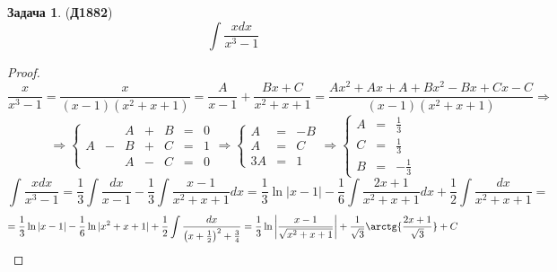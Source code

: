 \documentclass[12pt]{article}
\theoremstyle{definition}
\newtheorem{problem}{Задача}
\DeclareMathOperator{\dint}{\displaystyle\int}
\begin{document}
\begin{problem}(\textbf{Д1882})
	$$
		\dint \dfrac{xdx}{x^3 - 1}
	$$
\end{problem}
\begin{proof}
	$$
		\dfrac{x}{x^3 - 1} = \dfrac{x}{(x-1)(x^2+ x + 1)} = \dfrac{A}{x- 1} + \dfrac{Bx + C}{x^2 + x + 1} = \dfrac{Ax^2 + Ax + A + Bx^2 -Bx + Cx - C}{(x-1)(x^2+ x + 1)} \Rightarrow
	$$
	$$
		\Rightarrow 
		\left\{
			\begin{matrix}
				&&A &+& B &=& 0\\
				A &-& B &+& C &=& 1\\
				&&A &-& C &=& 0
			\end{matrix}
		\right.
		\Rightarrow 
		\left\{
			\begin{matrix}
				A &=& - B \\
				A &=& C\\
				3A &=& 1
			\end{matrix}
		\right.
		\Rightarrow 
		\left\{
			\begin{matrix}
				A &=& \tfrac{1}{3} \\[5pt]
				C &=& \tfrac{1}{3}\\[5pt]
				B &=& -\tfrac{1}{3}
			\end{matrix}
		\right.
	$$
	$$
		\dint \dfrac{xdx}{x^3 - 1} = \dfrac{1}{3}\dint \dfrac{dx}{x - 1}  -\dfrac{1}{3}\dint \dfrac{x - 1}{x^2 + x + 1}dx = \dfrac{1}{3}\ln{|x-1|} - \dfrac{1}{6}\dint \dfrac{2x + 1}{x^2 + x + 1}dx + \dfrac{1}{2}\dint \dfrac{dx}{x^2 + x + 1} =
	$$
	$$
		= \dfrac{1}{3}\ln{|x-1|} -\dfrac{1}{6}\ln{|x^2 + x + 1|} + \dfrac{1}{2}\dint\dfrac{dx}{\left(x + \frac{1}{2}\right)^2 + \frac{3}{4}} = \dfrac{1}{3}\ln{\left| \dfrac{x-1}{\sqrt{x^2 + x + 1}}\right|} + \dfrac{1}{\sqrt{3}}\arctg{\dfrac{2x + 1}{\sqrt{3}}} + C
	$$
\end{proof}
\end{document}

